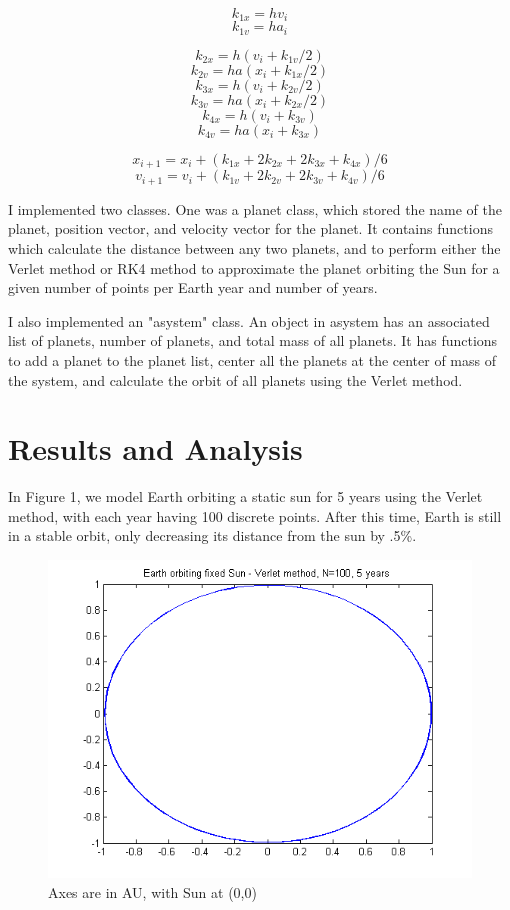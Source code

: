\documentclass[11pt]{article}
\begin{document}
$$k_{1x} = hv_i$$
$$k_{1v} = ha_i$$

$$k_{2x} = h(v_i+k_{1v}/2)$$
$$k_{2v} = ha(x_i+k_{1x}/2)$$
$$k_{3x} = h(v_i+k_{2v}/2)$$
$$k_{3v} = ha(x_i+k_{2x}/2)$$
$$k_{4x} = h(v_i+k_{3v})$$
$$k_{4v} = ha(x_i+k_{3x})$$

$$x_{i+1} = x_i + (k_{1x} + 2k_{2x} + 2k_{3x} + k_{4x})/6$$
$$v_{i+1} = v_i + (k_{1v} + 2k_{2v} + 2k_{3v} + k_{4v})/6$$

I implemented two classes. One was a planet class, which stored the name of the planet, position vector, and velocity vector for the planet. It contains functions which calculate the distance between any two planets, and to perform either the Verlet method or RK4 method to approximate the planet orbiting the Sun for a given number of points per Earth year and number of years.

I also implemented an "asystem" class. An object in asystem has an associated list of planets, number of planets, and total mass of all planets. It has functions to add a planet to the planet list, center all the planets at the center of mass of the system, and calculate the orbit of all planets using the Verlet method.

\section{Results and Analysis}
In Figure 1, we model Earth orbiting a static sun for 5 years using the Verlet method, with each year having 100 discrete points. After this time, Earth is still in a stable orbit, only decreasing its distance from the sun by .5\%.

\begin{figure}
	\includegraphics[width=\linewidth]{EarthverletN100yr5}
	\caption{Axes are in AU, with Sun at (0,0)}
\end{figure}
 
\end{document}
